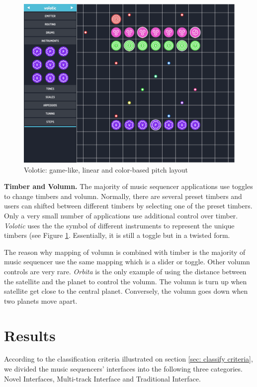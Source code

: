 \bigskip
\begin{figure}[h]
  \includegraphics[width=12 cm]{images/Volotic.PNG}
  \centering
  \caption{Volotic: game-like, linear and color-based pitch layout}
  \label{fig: Volotic}
\end{figure}
\bigskip

\textbf{Timber and Volumn.} The majority of music sequencer applications use toggles to change timbers and volumn. Normally, there are several preset timbers and users can shifted between different timbers by selecting one of the preset timbers. Only a very small number of applications use additional control over timber. \textit{Volotic} uses the the symbol of different instruments to represent the unique timbers (see Figure \ref{fig: Volotic}. Essentially, it is still a toggle but in a twisted form.

The reason why mapping of volumn is combined with timber is the majority of music sequencer use the same mapping which is a slider or toggle. Other volumn controls are very rare. \textit{Orbita} is the only example of using the distance between the satellite and the planet to control the volumn. The volumn is turn up when satellite get close to the central planet. Conversely, the volumn goes down when two planets move apart.



\section{Results}

According to the classification criteria illustrated on section \ref{sec: classify criteria}, we divided the music sequencers' interfaces into the following three categories. Novel Interfaces, Multi-track Interface and Traditional Interface.

